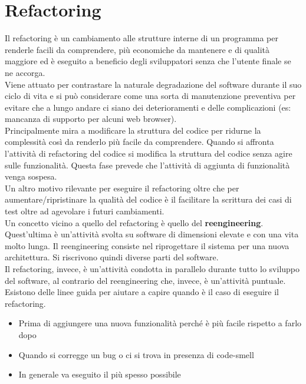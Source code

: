 \section{Refactoring}
\label{sec:08_refactoring}
Il refactoring è un cambiamento alle strutture interne di un programma per renderle facili da comprendere, più economiche da mantenere e di qualità maggiore ed è eseguito a beneficio degli sviluppatori senza che l'utente finale se ne accorga.\\
Viene attuato per contrastare la naturale degradazione del software durante il suo ciclo di vita e si può considerare come una sorta di manutenzione preventiva per evitare che a lungo andare ci siano dei deterioramenti e delle complicazioni (es: mancanza di supporto per alcuni web browser).\\
Principalmente mira a modificare la struttura del codice per ridurne la complessità così da renderlo più facile da comprendere.
Quando si affronta l'attività di refactoring del codice si modifica la struttura del codice senza agire sulle funzionalità.
Questa fase prevede che l'attività di aggiunta di funzionalità venga sospesa.\\
Un altro motivo rilevante per eseguire il refactoring oltre che per aumentare/ripristinare la qualità del codice è il facilitare la scrittura dei casi di test oltre ad agevolare i futuri cambiamenti.\\
Un concetto vicino a quello del refactoring è quello del \textbf{reengineering}.
Quest'ultima è un'attività svolta su software di dimensioni elevate e con una vita molto lunga.
Il reengineering consiste nel riprogettare il sistema per una nuova architettura.
Si riscrivono quindi diverse parti del software.\\
Il refactoring, invece, è un'attività condotta in parallelo durante tutto lo sviluppo del software, al contrario del reengineering che, invece, è un'attività puntuale.\\
Esistono delle linee guida per aiutare a capire quando è il caso di eseguire il refactoring.
\begin{itemize}[noitemsep]
    \item Prima di aggiungere una nuova funzionalità perché è più facile rispetto a farlo dopo
    \item Quando si corregge un bug o ci si trova in presenza di code-smell
    \item In generale va eseguito il più spesso possibile
\end{itemize}

